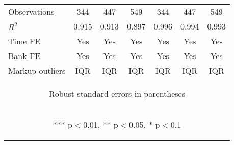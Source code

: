 \documentclass[]{article}
\begin{document}
\begin{center}
\begin{tabular}{lcccccc}
Observations & 344 & 447 & 549 & 344 & 447 & 549 \\
$R^2$ & 0.915 & 0.913 & 0.897 & 0.996 & 0.994 & 0.993 \\
Time FE & Yes & Yes & Yes & Yes & Yes & Yes \\
Bank FE & Yes & Yes & Yes & Yes & Yes & Yes \\
 Markup outliers & IQR & IQR & IQR & IQR & IQR & IQR \\ \hline
\multicolumn{7}{c}{\begin{footnotesize} Robust standard errors in parentheses\end{footnotesize}} \\
\multicolumn{7}{c}{\begin{footnotesize} *** p$<$0.01, ** p$<$0.05, * p$<$0.1\end{footnotesize}} \\
\end{tabular}
\end{center}
\end{document}
